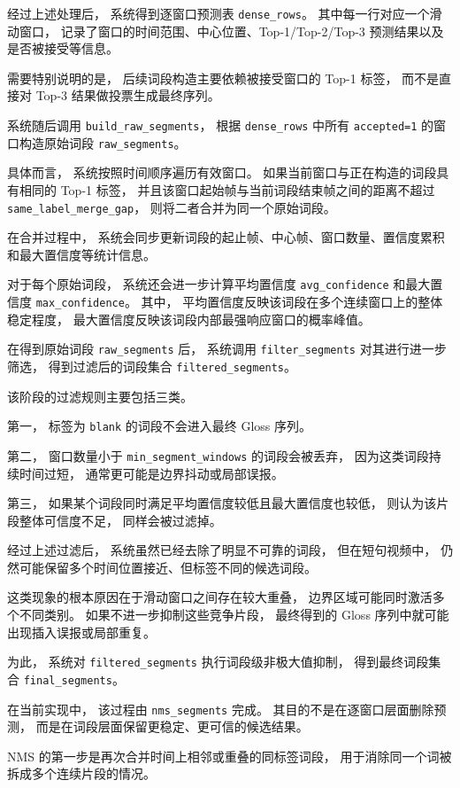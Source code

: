 经过上述处理后，
系统得到逐窗口预测表 \texttt{dense\_rows}。
其中每一行对应一个滑动窗口，
记录了窗口的时间范围、中心位置、Top-1/Top-2/Top-3 预测结果以及是否被接受等信息。

需要特别说明的是，
后续词段构造主要依赖被接受窗口的 Top-1 标签，
而不是直接对 Top-3 结果做投票生成最终序列。

系统随后调用 \texttt{build\_raw\_segments}，
根据 \texttt{dense\_rows} 中所有 \texttt{accepted=1} 的窗口构造原始词段 \texttt{raw\_segments}。

具体而言，
系统按照时间顺序遍历有效窗口。
如果当前窗口与正在构造的词段具有相同的 Top-1 标签，
并且该窗口起始帧与当前词段结束帧之间的距离不超过 \texttt{same\_label\_merge\_gap}，
则将二者合并为同一个原始词段。

在合并过程中，
系统会同步更新词段的起止帧、中心帧、窗口数量、置信度累积和最大置信度等统计信息。

对于每个原始词段，
系统还会进一步计算平均置信度 \texttt{avg\_confidence} 和最大置信度 \texttt{max\_confidence}。
其中，
平均置信度反映该词段在多个连续窗口上的整体稳定程度，
最大置信度反映该词段内部最强响应窗口的概率峰值。

在得到原始词段 \texttt{raw\_segments} 后，
系统调用 \texttt{filter\_segments} 对其进行进一步筛选，
得到过滤后的词段集合 \texttt{filtered\_segments}。

该阶段的过滤规则主要包括三类。

第一，
标签为 \texttt{blank} 的词段不会进入最终 Gloss 序列。

第二，
窗口数量小于 \texttt{min\_segment\_windows} 的词段会被丢弃，
因为这类词段持续时间过短，
通常更可能是边界抖动或局部误报。

第三，
如果某个词段同时满足平均置信度较低且最大置信度也较低，
则认为该片段整体可信度不足，
同样会被过滤掉。

经过上述过滤后，
系统虽然已经去除了明显不可靠的词段，
但在短句视频中，
仍然可能保留多个时间位置接近、但标签不同的候选词段。

这类现象的根本原因在于滑动窗口之间存在较大重叠，
边界区域可能同时激活多个不同类别。
如果不进一步抑制这些竞争片段，
最终得到的 Gloss 序列中就可能出现插入误报或局部重复。

为此，
系统对 \texttt{filtered\_segments} 执行词段级非极大值抑制，
得到最终词段集合 \texttt{final\_segments}。

在当前实现中，
该过程由 \texttt{nms\_segments} 完成。
其目的不是在逐窗口层面删除预测，
而是在词段层面保留更稳定、更可信的候选结果。

NMS 的第一步是再次合并时间上相邻或重叠的同标签词段，
用于消除同一个词被拆成多个连续片段的情况。

